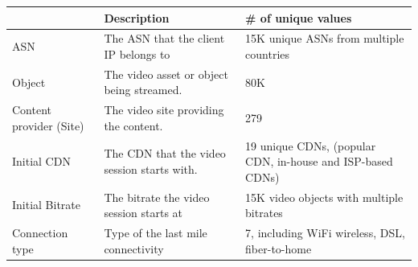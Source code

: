 \begin{table}[h!]
\begin{center}
\begin{small}
\begin{tabular}{p{1.7cm}|p{2.8cm}|p{2.8cm}}
    ~                          & Description                                                       & \# of unique values                                                          \\ \hline
    ASN                        & The ASN that the client IP belongs to  & 15K unique ASNs from multiple countries                                  \\ \hline
    Object                     &  The video asset or object being streamed.                  & 80K                                                                           \\ \hline
    Content provider (Site)    & The video site providing the content.                             & 279                                                                          \\ \hline
    Initial CDN                &  	The CDN that the video session starts with.                & 19 unique CDNs, (popular CDN, in-house and ISP-based CDNs) \\ \hline
     Initial Bitrate     &  		The bitrate the video session starts at          & 15K video objects with multiple bitrates                          \\ \hline
     Connection type     &  	Type of the last mile connectivity                         & 7, including WiFi wireless, DSL, fiber-to-home                                    \\
\end{tabular}
\end{small}
\end{center}
\label{tab:attributes}
\end{table}

